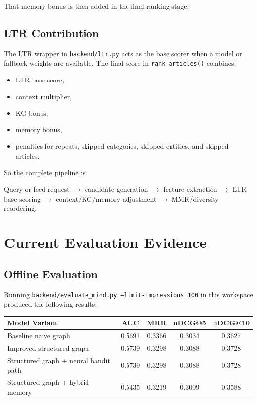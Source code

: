 \documentclass[12pt]{article}
\begin{document}
That memory bonus is then added in the final ranking stage.

\subsection{LTR Contribution}
The LTR wrapper in \texttt{backend/ltr.py} acts as the base scorer when a model or fallback weights are available. The final score in \texttt{rank\_articles()} combines:
\begin{itemize}[leftmargin=1.5em]
  \item LTR base score,
  \item context multiplier,
  \item KG bonus,
  \item memory bonus,
  \item penalties for repeats, skipped categories, skipped entities, and skipped articles.
\end{itemize}

So the complete pipeline is:
\begin{center}
Query or feed request $\rightarrow$ candidate generation $\rightarrow$ feature extraction $\rightarrow$ LTR base scoring $\rightarrow$ context/KG/memory adjustment $\rightarrow$ MMR/diversity reordering.
\end{center}

\section{Current Evaluation Evidence}
\subsection{Offline Evaluation}
Running \texttt{backend/evaluate\_mind.py --limit-impressions 100} in this workspace produced the following results:

\begin{center}
\begin{tabular}{lcccc}
\toprule
Model Variant & AUC & MRR & nDCG@5 & nDCG@10 \\
\midrule
Baseline naive graph & 0.5691 & 0.3366 & 0.3034 & 0.3627 \\
Improved structured graph & 0.5739 & 0.3298 & 0.3088 & 0.3728 \\
Structured graph + neural bandit path & 0.5739 & 0.3298 & 0.3088 & 0.3728 \\
Structured graph + hybrid memory & 0.5435 & 0.3219 & 0.3009 & 0.3588 \\
\bottomrule
\end{tabular}
\end{center}
\end{document}
